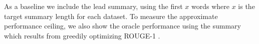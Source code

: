 As a baseline we include the lead summary, using the first $x$ words
where $x$ is the target summary length for each dataset.
To measure the approximate performance ceiling,
we also show the oracle performance using the 
summary which results from greedily optimizing ROUGE-1 .












